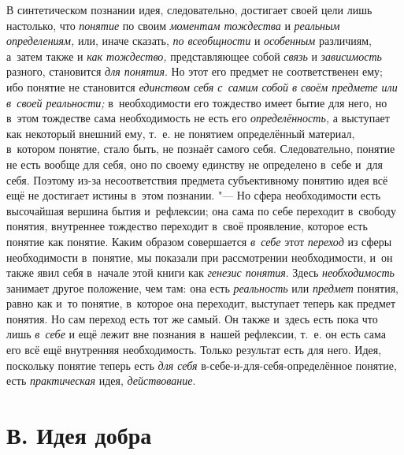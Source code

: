 В синтетическом познании идея, следовательно, достигает своей
цели лишь настолько, что {\em понятие}
по своим {\em моментам
тождества} и
{\em реальным определениям,}
или, иначе сказать,
{\em по всеобщности} и
{\em особенным}
различиям, а~затем также и
{\em как тождество,}
представляющее собой
{\em связь} и
{\em зависимость}
разного, становится
{\em для понятия}. Но
этот его предмет не соответственен ему; ибо понятие не становится
{\em единством себя с~самим собой в
своём предмете или в~своей реальности;} в~необходимости его
тождество имеет бытие для него, но в~этом тождестве сама необходимость не
есть его {\em определённость,}
а выступает как некоторый внешний ему, т.~е. не понятием
определённый материал, в~котором понятие, стало быть, не познаёт самого
себя. Следовательно, понятие не есть вообще для себя, оно по своему
единству не определено в~себе и~для себя. Поэтому из-за несоответствия
предмета субъективному понятию идея всё ещё не достигает
истины в~этом познании. "--- Но сфера необходимости есть
высочайшая вершина бытия и~рефлексии; она сама по себе переходит в~свободу
понятия, внутреннее тождество переходит в~своё проявление, которое есть
понятие как понятие. Каким образом совершается
{\em в~себе} этот
{\em переход} из сферы
необходимости в~понятие, мы показали при рассмотрении необходимости, и~он
также явил себя в~начале этой книги как
{\em генезис понятия}.
Здесь {\em необходимость}
занимает другое положение, чем там: она есть
{\em реальность} или
{\em предмет} понятия,
равно как и~то понятие, в~которое она переходит, выступает теперь как
предмет понятия. Но сам переход есть тот же самый. Он также и~здесь есть
пока что лишь {\em в~себе}
и ещё лежит вне познания в~нашей рефлексии, т.~е. он есть
сама его всё ещё внутренняя необходимость. Только результат есть для него.
Идея, поскольку понятие теперь есть
{\em для себя}
в-себе-и-для-себя-определённое понятие, есть
{\em практическая} идея,
{\em действование}.

\section[В. Идея добра]{В. Идея добра}

